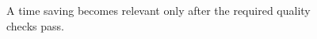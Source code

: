 \begin{figure}[H]
\centering
{}
\caption{A time saving becomes relevant only after the required quality checks pass.}\label{fig:gap-evaluation-quality}
\end{figure}

